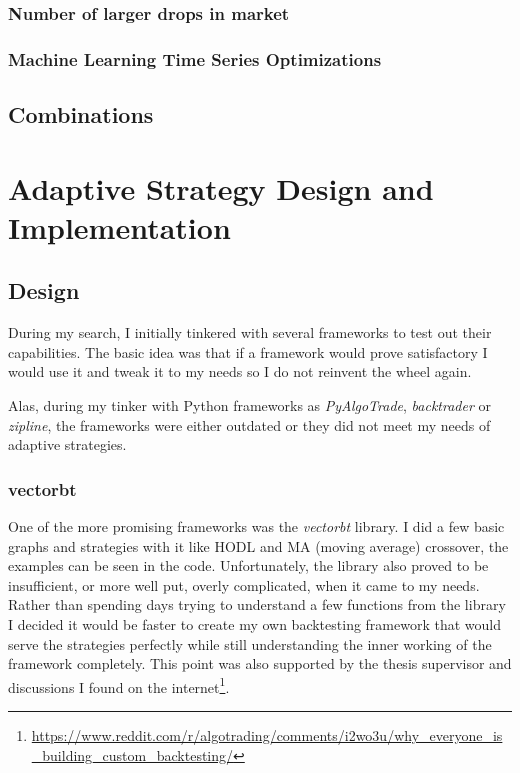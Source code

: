 \subsection*{Number of larger drops in market}

\subsection*{Machine Learning Time Series Optimizations}

\section{Combinations}

\chapter{Adaptive Strategy Design and Implementation}
\label{chapter-implementation}

\section{Design}
During my search, I initially tinkered with several frameworks to test out their capabilities. The basic idea was that if a framework would prove satisfactory I would use it and tweak it to my needs so I do not reinvent the wheel again.

Alas, during my tinker with Python frameworks as \emph{PyAlgoTrade}, \emph{backtrader} or \emph{zipline}, the frameworks were either outdated or they did not meet my needs of adaptive strategies.

\subsection*{vectorbt}
One of the more promising frameworks was the \emph{vectorbt} library. I did a few basic graphs and strategies with it like HODL and MA (moving average) crossover, the examples can be seen in the code. Unfortunately, the library also proved to be insufficient, or more well put, overly complicated, when it came to my needs. Rather than spending days trying to understand a few functions from the library I decided it would be faster to create my own backtesting framework that would serve the strategies perfectly while still understanding the inner working of the framework completely. This point was also supported by the thesis supervisor and discussions I found on the internet\footnote{\url{https://www.reddit.com/r/algotrading/comments/i2wo3u/why_everyone_is_building_custom_backtesting/}}.

